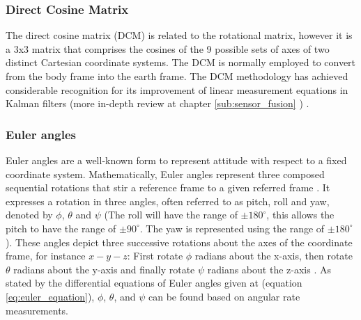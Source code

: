 \subsubsection{Direct Cosine Matrix}

The direct cosine matrix (DCM) is related to the rotational matrix, however it is a 3x3 matrix that comprises the cosines of the 9 possible sets of axes of two distinct Cartesian coordinate systems. The DCM is normally employed to convert from the body frame into the earth frame. The DCM methodology has achieved considerable recognition for its improvement of linear measurement equations in Kalman filters (more in-depth review at chapter \ref{sub:sensor_fusion} ) \cite{premerlani2009direction}.

\subsubsection{Euler angles}

Euler angles are a well-known form to represent attitude with respect to a fixed coordinate system. Mathematically, Euler angles represent three composed sequential rotations that stir a reference frame to a given referred frame \cite{diebel2006representing}. It expresses a rotation in three angles, often referred to as pitch, roll and yaw, denoted by $\phi$, $\theta$ and $\psi$ (The roll will have the range of $\pm180^\circ$, this allows the pitch to have the range of $\pm90^{\circ}$. The yaw is represented using the range of $\pm180^{\circ}$). These angles depict three successive rotations about the axes of the coordinate frame, for instance $x-y-z$: First rotate $\phi$ radians about the x-axis, then rotate $\theta$ radians about the y-axis and finally rotate $\psi$ radians about the z-axis \cite{grado1960solution}. As stated by the differential equations of Euler angles given at (equation \ref{eq:euler_equation}), $\phi$, $\theta$, and $\psi$ can be found based on angular rate measurements.


